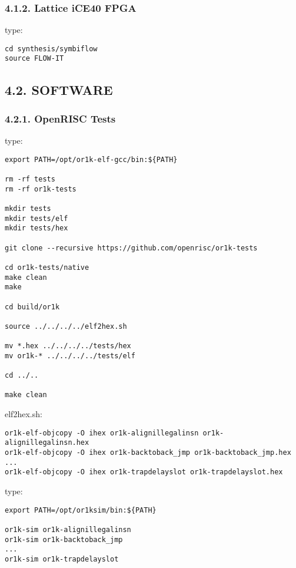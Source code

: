\documentclass[]{article}
\begin{document}
\subsubsection{4.1.2. Lattice iCE40 FPGA}\label{lattice-ice40-fpga}

type:

\begin{verbatim}
cd synthesis/symbiflow
source FLOW-IT
\end{verbatim}

\subsection{4.2. SOFTWARE}\label{software-1}

\subsubsection{4.2.1. OpenRISC Tests}\label{openrisc-tests}

type:

\begin{verbatim}
export PATH=/opt/or1k-elf-gcc/bin:${PATH}

rm -rf tests
rm -rf or1k-tests

mkdir tests
mkdir tests/elf
mkdir tests/hex

git clone --recursive https://github.com/openrisc/or1k-tests

cd or1k-tests/native
make clean
make

cd build/or1k

source ../../../../elf2hex.sh

mv *.hex ../../../../tests/hex
mv or1k-* ../../../../tests/elf

cd ../..

make clean
\end{verbatim}

elf2hex.sh:

\begin{verbatim}
or1k-elf-objcopy -O ihex or1k-alignillegalinsn or1k-alignillegalinsn.hex
or1k-elf-objcopy -O ihex or1k-backtoback_jmp or1k-backtoback_jmp.hex
...
or1k-elf-objcopy -O ihex or1k-trapdelayslot or1k-trapdelayslot.hex
\end{verbatim}

type:

\begin{verbatim}
export PATH=/opt/or1ksim/bin:${PATH}

or1k-sim or1k-alignillegalinsn
or1k-sim or1k-backtoback_jmp
...
or1k-sim or1k-trapdelayslot
\end{verbatim}
\end{document}
